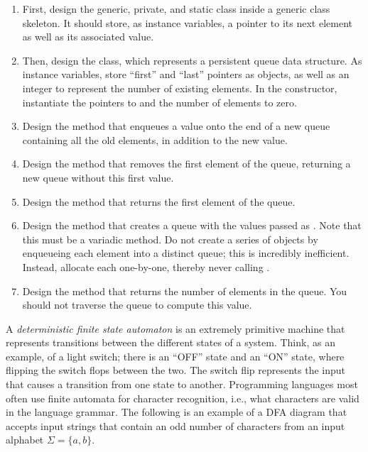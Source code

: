 \begin{enumerate}[label=(\alph*)]
    \item First, design the generic, private, and static class  inside a generic  class skeleton. It should store, as instance variables, a pointer to its next element as well as its associated value.
    \item Then, design the  class, which represents a persistent queue data structure. As instance variables, store ``first'' and ``last'' pointers as  objects, as well as an integer to represent the number of existing elements. In the constructor, instantiate the pointers to  and the number of elements to zero.
    \item Design the  method that enqueues a value onto the end of a new queue containing all the old elements, in addition to the new value.
    \item Design the  method that removes the first element of the queue, returning a new queue without this first value.
    \item Design the  method that returns the first element of the queue.
    \item Design the  method that creates a queue with the values passed as . Note that this must be a variadic method. Do not create a series of  objects by enqueueing each element into a distinct queue; this is incredibly inefficient. Instead, allocate each  one-by-one, thereby never calling .
    \item Design the  method that returns the number of elements in the queue. You should not traverse the queue to compute this value. 
\end{enumerate}


A \emph{deterministic finite state automaton} is an extremely primitive machine that represents transitions between the different states of a system. Think, as an example, of a light switch; there is an ``OFF'' state and an ``ON'' state, where flipping the switch flops between the two. The switch flip represents the input that causes a transition from one state to another. Programming languages most often use finite automata for character recognition, i.e., what characters are valid in the language grammar. The following is an example of a DFA diagram that accepts input strings that contain an odd number of  characters from an input alphabet $\Sigma = \{a, b\}$.

